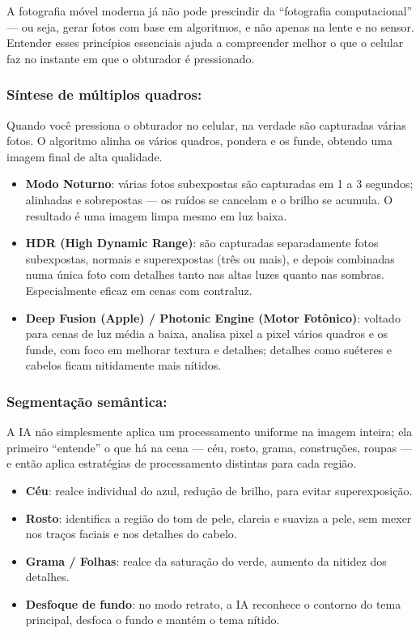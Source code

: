 
A fotografia móvel moderna já não pode prescindir da “fotografia computacional” — ou seja, gerar fotos com base em algoritmos, e não apenas na lente e no sensor. Entender esses princípios essenciais ajuda a compreender melhor o que o celular faz no instante em que o obturador é pressionado.

\subsubsection*{Síntese de múltiplos quadros:}

Quando você pressiona o obturador no celular, na verdade são capturadas várias fotos. O algoritmo alinha os vários quadros, pondera e os funde, obtendo uma imagem final de alta qualidade.

\begin{itemize}
  \item \textbf{Modo Noturno}: várias fotos subexpostas são capturadas em 1 a 3 segundos; alinhadas e sobrepostas — os ruídos se cancelam e o brilho se acumula. O resultado é uma imagem limpa mesmo em luz baixa.
  \item \textbf{HDR (High Dynamic Range)}: são capturadas separadamente fotos subexpostas, normais e superexpostas (três ou mais), e depois combinadas numa única foto com detalhes tanto nas altas luzes quanto nas sombras. Especialmente eficaz em cenas com contraluz.
  \item \textbf{Deep Fusion (Apple) / Photonic Engine (Motor Fotônico)}: voltado para cenas de luz média a baixa, analisa pixel a pixel vários quadros e os funde, com foco em melhorar textura e detalhes; detalhes como suéteres e cabelos ficam nitidamente mais nítidos.
\end{itemize}

\subsubsection*{Segmentação semântica:}

A IA não simplesmente aplica um processamento uniforme na imagem inteira; ela primeiro “entende” o que há na cena — céu, rosto, grama, construções, roupas — e então aplica estratégias de processamento distintas para cada região.

\begin{itemize}
  \item \textbf{Céu}: realce individual do azul, redução de brilho, para evitar superexposição.
  \item \textbf{Rosto}: identifica a região do tom de pele, clareia e suaviza a pele, sem mexer nos traços faciais e nos detalhes do cabelo.
  \item \textbf{Grama / Folhas}: realce da saturação do verde, aumento da nitidez dos detalhes.
  \item \textbf{Desfoque de fundo}: no modo retrato, a IA reconhece o contorno do tema principal, desfoca o fundo e mantém o tema nítido.
\end{itemize}

